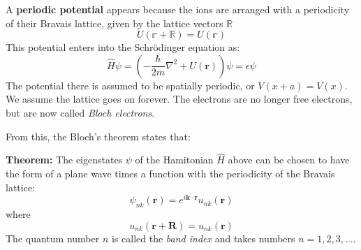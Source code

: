 A \textbf{periodic potential} appears because the ions are arranged with a periodicity of their Bravais lattice, given by the lattice vectors $\mathbb{R}$ \begin{equation}
    U(\mathbb{r}+\mathbb{R}) = U(\mathbb{r})
\end{equation}
This potential enters into the Schrödinger equation as: \begin{equation}
    \hat{H} \psi = \left(-\frac{\hbar}{2m}\nabla^{2}+ U(\mathbf{r})\right)\psi = \epsilon \psi
\end{equation}
The potential there is assumed to be spatially periodic, or $V(x+a)=V(x)$. We assume the lattice goes on forever. The electrons are no longer free electrons, but are now called \textit{Bloch electrons}.

From this, the Bloch's theorem states that: 
\begin{theorem}
    \textbf{Theorem:} The eigenstates $\psi$ of the Hamitonian $\hat{H}$ above can be chosen to have the form of a plane wave 
times a function with the periodicity of the Bravais lattice:
\[
    \psi_{nk}(\mathbf{r}) = e^{i \mathbf{k} \cdot \mathbf{r}} u_{nk}(\mathbf{r})
\]
where
\[
    u_{nk}(\mathbf{r} + \mathbf{R}) = u_{nk}(\mathbf{r})
\]
The quantum number $n$ is called the \textit{band index} and takes numbers $n = 1, 2, 3, \dots$.
\end{theorem}